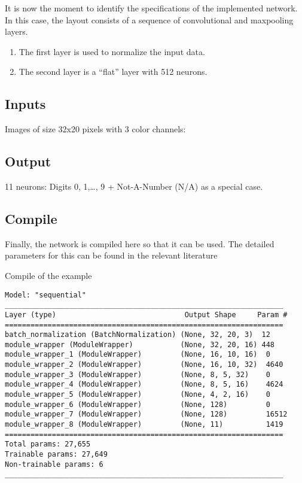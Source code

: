 It is now the moment to identify the specifications of the implemented network. In this case, the layout consists of a sequence of convolutional and maxpooling layers.

\begin{enumerate}
  \item The first layer is used to  normalize the input data. 
  \item The second layer is a “flat” layer with 512 neurons.
\end{enumerate}    

\subsection{Inputs}

Images of size 32x20 pixels with 3 color channels: 
  
  
\subsection{Output}

 11 neurons: Digits 0, 1,\ldots, 9 + Not-A-Number (N/A) as a special case.
 
 
\subsection{Compile}

Finally, the network is compiled here so that it can be used. The detailed parameters for this can be found in the relevant literature

\begin{code}
        
    
    \caption{Compile of the example} 
    
\end{code}    



\begin{verbatim}
Model: "sequential"
_________________________________________________________________
Layer (type)                              Output Shape     Param #
=================================================================
batch_normalization (BatchNormalization) (None, 32, 20, 3)  12
module_wrapper (ModuleWrapper)           (None, 32, 20, 16) 448
module_wrapper_1 (ModuleWrapper)         (None, 16, 10, 16)  0
module_wrapper_2 (ModuleWrapper)         (None, 16, 10, 32)  4640
module_wrapper_3 (ModuleWrapper)         (None, 8, 5, 32)    0
module_wrapper_4 (ModuleWrapper)         (None, 8, 5, 16)    4624
module_wrapper_5 (ModuleWrapper)         (None, 4, 2, 16)    0
module_wrapper_6 (ModuleWrapper)         (None, 128)         0
module_wrapper_7 (ModuleWrapper)         (None, 128)         16512
module_wrapper_8 (ModuleWrapper)         (None, 11)          1419
=================================================================
Total params: 27,655
Trainable params: 27,649
Non-trainable params: 6
_________________________________________________________________    
\end{verbatim}

